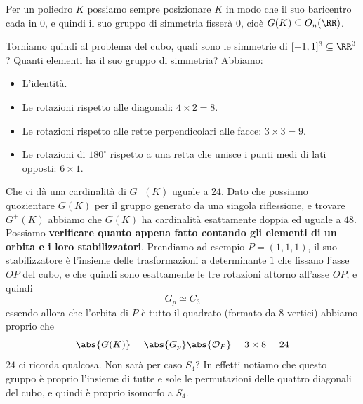 \documentclass[11pt]{scrartcl}
\begin{document}
	\begin{remark}
		Per un poliedro $K$ possiamo sempre posizionare $K$ in modo che il suo baricentro cada in $0$, e quindi il suo gruppo di simmetria fisserà $0$, cioè $G(K)\subseteq O_n(\RR)$.
	\end{remark}
	Torniamo quindi al problema del cubo, quali sono le simmetrie di $[-1,1]^3\subseteq \RR^3$? Quanti elementi ha il suo gruppo di simmetria? Abbiamo:
	\begin{itemize}
		\item L'identità.
		\item Le rotazioni rispetto alle diagonali: $4\times 2=8$.
		\item Le rotazioni rispetto alle rette perpendicolari alle facce: $3\times 3=9$.
		\item Le rotazioni di $180^\circ$ rispetto a una retta che unisce i punti medi di lati opposti: $6\times 1$.
	\end{itemize}
	Che ci dà una cardinalità di $G^+(K)$ uguale a $24$. Dato che possiamo quozientare $G(K)$ per il gruppo generato da una singola riflessione, e trovare $G^+(K)$ abbiamo che $G(K)$ ha cardinalità esattamente doppia ed uguale a $48$. Possiamo \textbf{verificare quanto appena fatto contando gli elementi di un orbita e i loro stabilizzatori}. Prendiamo ad esempio $P=(1,1,1)$, il suo stabilizzatore è l'insieme delle trasformazioni a determinante $1$ che fissano l'asse $OP$ del cubo, e che quindi sono esattamente le tre rotazioni attorno all'asse $OP$, e quindi 
	$$G_p\simeq C_3$$
	essendo allora che l'orbita di $P$ è tutto il quadrato (formato da $8$ vertici) abbiamo proprio che 
	$$\abs{G(K)}=\abs{G_p}\abs{\mathcal{O}_P}=3\times 8=24$$
	$24$ ci ricorda qualcosa. Non sarà per caso $S_4$? In effetti notiamo che questo gruppo è proprio l'insieme di tutte e sole le permutazioni delle quattro diagonali del cubo, e quindi è proprio isomorfo a $S_4$.
	
\end{document}
